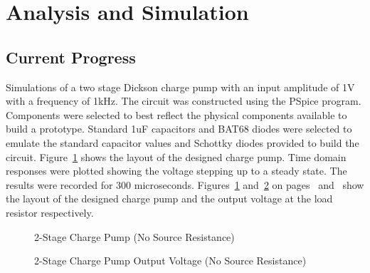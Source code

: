 \documentclass[12pt]{article}
\begin{document}
	\section{Analysis and Simulation}
	
	\subsection{Current Progress}
	Simulations of a two stage Dickson charge pump with an input amplitude of 1V with a frequency of 1kHz. The circuit was constructed using the PSpice program. Components were selected to best reflect the physical components available to build a prototype. Standard 1uF capacitors and BAT68 diodes were selected to emulate the standard capacitor values and Schottky diodes provided to build the circuit. Figure~\ref{fig:2SCP NSR} shows the layout of the designed charge pump. Time domain responses were plotted showing the voltage stepping up to a steady state. The results were recorded for 300 microseconds. Figures~\ref{fig:2SCP NSR} and~\ref{fig:2SCP NSR Out} on pages~\pageref{fig:2SCP NSR} and~\pageref{fig:2SCP NSR Out}  show the layout of the designed charge pump and the output voltage at the load resistor respectively.
	
\vspace{0.5em}
\begin{figure}[H]
\caption{2-Stage Charge Pump (No Source Resistance)}
\label{fig:2SCP NSR}
\end{figure}

\vspace{0.5em}
\begin{figure}[H]
\caption{2-Stage Charge Pump Output Voltage (No Source Resistance)}
\label{fig:2SCP NSR Out}
\end{figure}
\end{document}
